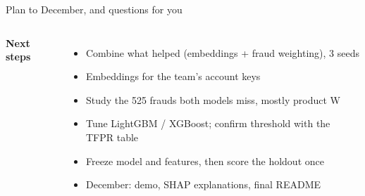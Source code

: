 \documentclass[aspectratio=169,10pt]{beamer}
\begin{document}
\begin{frame}{Plan to December, and questions for you}
\begin{columns}[T]
{\color{ink}\bfseries Next steps}\\[4pt]\small
\begin{itemize}\setlength{\itemsep}{1pt}
\item Combine what helped (embeddings + fraud weighting), 3 seeds
\item Embeddings for the team's account keys
\item Study the 525 frauds both models miss, mostly product W
\item Tune LightGBM / XGBoost; confirm threshold with the TFPR table
\item Freeze model and features, then score the holdout once
\item December: demo, SHAP explanations, final README
\end{itemize}
\end{columns}
\end{frame}
\end{document}
